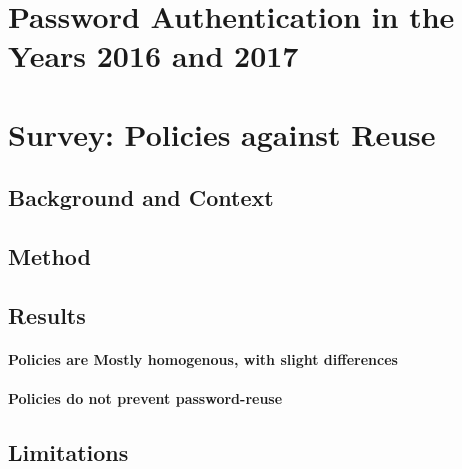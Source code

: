 \chapter[Password Authentication in the Years 2016 and 2017]{Password Authentication in the Years 2016 and 2017}

\chapter[Survey: Policies against Reuse]{Survey: Policies against Reuse}\label{chap:policies-reuse}
\section{Background and Context}
\section{Method}

\section{Results}
\subsubsection{Policies are Mostly homogenous, with slight differences}
\subsubsection{Policies do not prevent password-reuse}

\section{Limitations}

